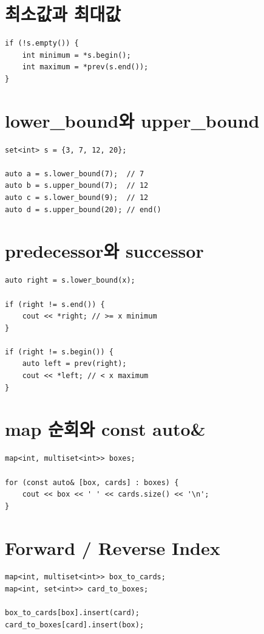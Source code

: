 \section{최소값과 최대값}
\begin{lstlisting}
if (!s.empty()) {
    int minimum = *s.begin();
    int maximum = *prev(s.end());
}
\end{lstlisting}

\section{lower\_bound와 upper\_bound}
\begin{lstlisting}
set<int> s = {3, 7, 12, 20};

auto a = s.lower_bound(7);  // 7
auto b = s.upper_bound(7);  // 12
auto c = s.lower_bound(9);  // 12
auto d = s.upper_bound(20); // end()
\end{lstlisting}

\section{predecessor와 successor}
\begin{lstlisting}
auto right = s.lower_bound(x);

if (right != s.end()) {
    cout << *right; // >= x minimum
}

if (right != s.begin()) {
    auto left = prev(right);
    cout << *left; // < x maximum
}
\end{lstlisting}

\section{map 순회와 const auto\&}
\begin{lstlisting}
map<int, multiset<int>> boxes;

for (const auto& [box, cards] : boxes) {
    cout << box << ' ' << cards.size() << '\n';
}
\end{lstlisting}

\section{Forward / Reverse Index}
\begin{lstlisting}
map<int, multiset<int>> box_to_cards;
map<int, set<int>> card_to_boxes;

box_to_cards[box].insert(card);
card_to_boxes[card].insert(box);
\end{lstlisting}

